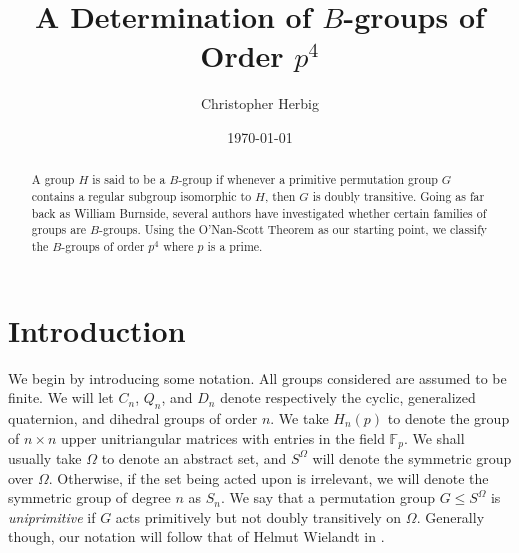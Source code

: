 \documentclass[12pt]{amsart}
\theoremstyle{definition}
\newcommand{\F}{\mathbb{F}}
\begin{document}
	
	\title[$B$-groups of order $p^4$]{A Determination of $B$-groups of Order $p^4$}
	
		
	\author[Christopher Herbig]{Christopher Herbig}
	\address{%
		Little Priest Tribal College\\
		Winnebago, NE 68071 \\
		USA}
	
	
	
	
	
	
	\date{\today}
	
	\maketitle
	
	\begin{abstract}
		A group $H$ is said to be a $B$-group if whenever a primitive permutation group $G$ contains a regular subgroup isomorphic to $H$, then $G$ is doubly transitive. Going as far back as William Burnside, several authors have investigated whether certain families of groups are $B$-groups. Using the O'Nan-Scott Theorem as our starting point, we classify the $B$-groups of order $p^4$ where $p$ is a prime.
	\end{abstract}
	
	
	\section{Introduction}
	
	We begin by introducing some notation. All groups considered are assumed to be finite. We will let $C_n$, $Q_n$, and $D_n$  denote respectively the cyclic, generalized quaternion, and dihedral groups of order $n$. We take $H_n(p)$ to denote the group of $n \times n$ upper unitriangular matrices with entries in the field $\F_p$. We shall usually take $\Omega$ to denote an abstract set, and $S^\Omega$ will denote the symmetric group over $\Omega$. Otherwise, if the set being acted upon is irrelevant, we will denote the symmetric group of degree $n$ as $S_n$. We say that a permutation group $G \leq S^\Omega$ is \emph{uniprimitive} if $G$ acts primitively but not doubly transitively on $\Omega$. Generally though, our notation will follow that of Helmut Wielandt in \cite{W}.
	
\end{document}
